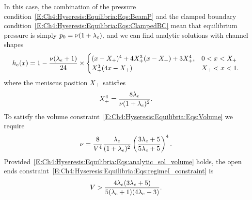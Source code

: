 In this case, the combination of the pressure condition~\eqref{E:Ch4:Hyseresis:Equilibria:Eqs:BeamP} and the clamped boundary condition~\eqref{E:Ch4:Hyseresis:Equilibria:Eqs:ClampedBC} mean that equilibrium pressure is simply $p_0 = \nu (1 + \lambda_e)$, and we can find  analytic solutions with channel shapes
\begin{equation}\label{E:Ch4:Hyseresis:Equilibria:Eqs:analytic_sol}
h_e(x) = 1-\frac{\nu(\lambda_e +1)}{24}\times\begin{cases} (x-X_{+})^4 + 4X_{+}^3(x-X_{+}) + 3X_{+}^4, & 0 < x < X_{+}\\
X_{+}^3 (4x-X_{+}) & X_{+} < x <1.
\end{cases}
\end{equation}
where the meniscus position $X_{+}$ satisfies
\begin{equation}\label{E:Ch4:Hyseresis:Equilibria:Eqs:analytic_sol_meniscus_position}
X_{+}^4 = \frac{8\lambda_e}{\nu (1 + \lambda_e)^2}.
\end{equation}
To satisfy the volume constraint~\eqref{E:Ch4:Hyseresis:Equilibria:Eqs:Volume} we require
\begin{equation}\label{E:Ch4:Hyseresis:Equilibria:Eqs:analytic_sol_volume}
\nu = \frac{8}{V^4}\frac{\lambda_e}{(1+\lambda_e)^2}\left(\frac{3\lambda_e + 5}{5\lambda_e + 5}\right)^4.
\end{equation}
Provided~\eqref{E:Ch4:Hyseresis:Equilibria:Eqs:analytic_sol_volume} holds, the open ends constraint~\eqref{E:Ch4:Hyseresis:Equilibria:Eqs:regimeI_constraint} is
\begin{equation}\label{E:Ch4:Hyseresis:Equilibria:Eqs:analytic_sol_open_ends}
V > \frac{4\lambda_e(3\lambda_e + 5)}{5(\lambda_e+1)(4\lambda_e + 3)}.
\end{equation}

